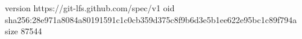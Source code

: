 version https://git-lfs.github.com/spec/v1
oid sha256:28e971a8084a80191591c1c0cb359d375c8f9b6d3e5b1ee622e95bc1c89f794a
size 87544
